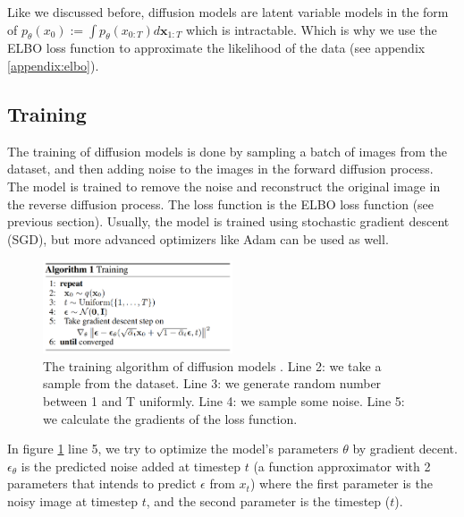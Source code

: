 Like we discussed before, diffusion models are latent variable models in the form of $p_\theta (x_0) := \int p_\theta(x_{0:T}) d\mathbf{x}_{1:T}$ which is intractable. Which is why we use the ELBO loss function to approximate the likelihood of the data (see appendix \ref{appendix:elbo}).






\subsection{Training}

The training of diffusion models is done by sampling a batch of images from the dataset, and then adding noise to the images in the forward diffusion process. The model is trained to remove the noise and reconstruct the original image in the reverse diffusion process. The loss function is the ELBO loss function (see previous section). Usually, the model is trained using stochastic gradient descent (SGD), but more advanced optimizers like Adam can be used as well.

\begin{figure}
    \centering
    \includegraphics[width=0.5\textwidth]{images/diffusion_models/training.png}
    \caption{The training algorithm of diffusion models \cite{ddpm}. Line 2: we take a sample from the dataset. Line 3: we generate random number between 1 and T uniformly. Line 4: we sample some noise. Line 5: we calculate the gradients of the loss function.}
    \label{fig:ddpm_training}
\end{figure}

In figure \ref{fig:ddpm_training} line 5, we try to optimize the model's parameters $\theta$ by gradient decent. $\epsilon_\theta$ is the predicted noise added at timestep $t$ (a function approximator with 2 parameters that intends to predict $\epsilon$ from $x_t$) where the first parameter is the noisy image at timestep $t$, and the second parameter is the timestep ($t$). 







